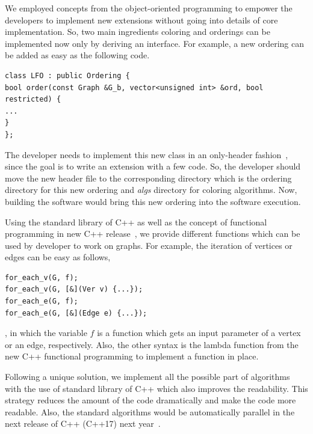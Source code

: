 \documentclass[12pt, twoside]{book}
\begin{document}
We employed concepts from the object-oriented programming to empower
the developers to implement new extensions without going into
details of core implementation. So, two main ingredients coloring
and orderings can be implemented now only by deriving an interface.
For example, a new ordering can be added as easy as the following code.
\begin{lstlisting}
class LFO : public Ordering {
bool order(const Graph &G_b, vector<unsigned int> &ord, bool restricted) {
...
}
};
\end{lstlisting}
The developer needs to implement this new class in an only-header fashion~\cite{headeronly},
since the goal is to write an extension with a few code. So, the developer should
move the new header file to the corresponding directory which is the ordering directory
for this new ordering and \textit{algs} directory for coloring algorithms.
Now, building the software would bring this new ordering into the software execution.


Using the standard library of C++ as well as the concept of functional programming
in new C++ release~\cite{Sutherland2015}, we provide different functions which can be used
by developer to work on graphs. For example, the iteration of vertices
or edges can be easy as follows,
\begin{lstlisting}
for_each_v(G, f);
for_each_v(G, [&](Ver v) {...});
for_each_e(G, f);
for_each_e(G, [&](Edge e) {...});
\end{lstlisting}
, in which the variable $f$ is a function which gets an input parameter
of a vertex or an edge, respectively.
Also, the other syntax is the lambda function
from the new C++ functional programming to implement a function in place.

Following a unique solution, we implement all the possible part of algorithms
with the use of standard library of C++ which also improves the readability.
This strategy reduces the amount of the code dramatically and
make the code more readable.
Also, the standard algorithms would be automatically parallel in the next
release of C++ (C++17) next year~\cite{parallelcpp}.
\end{document}
